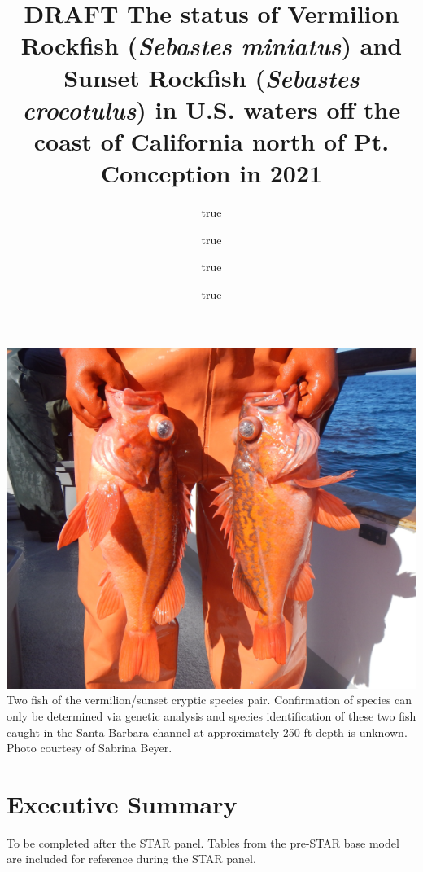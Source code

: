 \documentclass[
  english,
  a4paper,
]{article}
\title{DRAFT The status of Vermilion Rockfish (\emph{Sebastes miniatus}) and Sunset Rockfish (\emph{Sebastes crocotulus}) in U.S. waters off the coast of California north of Pt. Conception in 2021}
\author{true \and true \and true \and true}
\date{}
\begin{document}
\maketitle

{
\setcounter{tocdepth}{2}
\tableofcontents
}
\newcommand\CapeM{$40^\circ 10^\prime N$}
\newcommand\PtC{$34^\circ 27^\prime N$}
\newcommand\CAOR{$42^\circ 00^\prime N$}

\newpage

\includegraphics{cover_photo.png}
Two fish of the vermilion/sunset cryptic species pair. Confirmation of
species can only be determined via genetic analysis and species identification
of these two fish caught in the Santa Barbara channel at approximately 250 ft depth
is unknown. Photo courtesy of Sabrina Beyer.

\pagebreak
{}
\setcounter{page}{1}

\renewcommand{\thetable}{\roman{table}}
\renewcommand{\thefigure}{\roman{figure}}

\setlength\parskip{0.5em plus 0.1em minus 0.2em}

\hypertarget{executive-summary}{%
\section*{Executive Summary}\label{executive-summary}}

To be completed after the STAR panel. Tables from the pre-STAR base model
are included for reference during the STAR panel.
\end{document}
